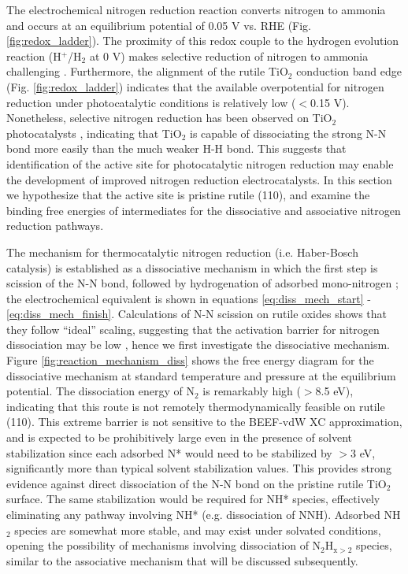 \documentclass[journal=ascecg,manuscript=article,articletitle=true]{achemso}
\begin{document}
The electrochemical nitrogen reduction reaction converts nitrogen to ammonia and occurs at an equilibrium potential of 0.05 V vs. RHE (Fig. \ref{fig:redox_ladder}). The proximity of this redox couple to the hydrogen evolution reaction (H$^+$/H$_2$ at 0 V) makes selective reduction of nitrogen to ammonia challenging \cite{Skulason_2012, Montoya_2015,Singh_2017}. Furthermore, the alignment of the rutile TiO$_2$ conduction band edge (Fig. \ref{fig:redox_ladder}) indicates that the available overpotential for nitrogen reduction under photocatalytic conditions is relatively low ($<$0.15 V).  Nonetheless, selective nitrogen reduction has been observed on TiO$_2$ photocatalysts \cite{Schrauzer_1977, Schrauzer_1983,Schrauzer_2011,Augugliaro_1982}, indicating that TiO$_2$ is capable of dissociating the strong N-N bond more easily than the much weaker H-H bond. This suggests that identification of the active site for photocatalytic nitrogen reduction may enable the development of improved nitrogen reduction electrocatalysts. In this section we hypothesize that the active site is pristine rutile (110), and examine the binding free energies of intermediates for the dissociative and associative nitrogen reduction pathways.

  The mechanism for thermocatalytic nitrogen reduction (i.e. Haber-Bosch catalysis) is established as a dissociative mechanism in which the first step is scission of the N-N bond, followed by hydrogenation of adsorbed mono-nitrogen \cite{Emmett_1933,Ertl_1976,Spencer_1981,Honkala_2005}; the electrochemical equivalent is shown in equations \ref{eq:diss_mech_start} - \ref{eq:diss_mech_finish}. Calculations of N-N scission on rutile oxides shows that they follow ``ideal'' scaling, suggesting that the activation barrier for nitrogen dissociation may be low \cite{Vojvodic_2014}, hence we first investigate the dissociative mechanism. Figure \ref{fig:reaction_mechanism_diss} shows the free energy diagram for the dissociative mechanism at standard temperature and pressure at the equilibrium potential. The dissociation energy of N$_2$ is remarkably high ($>$8.5 eV), indicating that this route is not remotely thermodynamically feasible on rutile (110). This extreme barrier is not sensitive to the BEEF-vdW XC approximation, and is expected to be prohibitively large even in the presence of solvent stabilization since each adsorbed N* would need to be stabilized by $>$3 eV, significantly more than typical solvent stabilization values\cite{Karlberg_2007,He_2017,Hellman2017}. This provides strong evidence against direct dissociation of the N-N bond on the pristine rutile TiO$_2$ surface. The same stabilization would be required for NH* species, effectively eliminating any pathway involving NH* (e.g. dissociation of NNH). Adsorbed NH$_2$ species are somewhat more stable, and may exist under solvated conditions, opening the possibility of mechanisms involving dissociation of N$_2$H$_{\mathrm{x}>2}$ species, similar to the associative mechanism that will be discussed subsequently.
  
\end{document}

